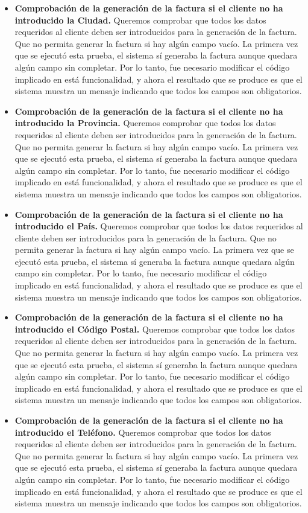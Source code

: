 \begin{itemize}
\begin{itemize}
	\item \textbf{Comprobación de la generación de la factura si el cliente no ha introducido la Ciudad.} Queremos comprobar que todos los datos requeridos al cliente deben ser introducidos para la generación de la factura. Que no permita generar la factura si hay algún campo vacío. La primera vez que se ejecutó esta prueba, el sistema sí generaba la factura aunque quedara algún campo sin completar. Por lo tanto, fue necesario modificar el código implicado en está funcionalidad, y ahora el resultado que se produce es que el sistema muestra un mensaje indicando que todos los campos son obligatorios.
	\item \textbf{Comprobación de la generación de la factura si el cliente no ha introducido la Provincia.} Queremos comprobar que todos los datos requeridos al cliente deben ser introducidos para la generación de la factura. Que no permita generar la factura si hay algún campo vacío. La primera vez que se ejecutó esta prueba, el sistema sí generaba la factura aunque quedara algún campo sin completar. Por lo tanto, fue necesario modificar el código implicado en está funcionalidad, y ahora el resultado que se produce es que el sistema muestra un mensaje indicando que todos los campos son obligatorios.
	\item \textbf{Comprobación de la generación de la factura si el cliente no ha introducido el País.} Queremos comprobar que todos los datos requeridos al cliente deben ser introducidos para la generación de la factura. Que no permita generar la factura si hay algún campo vacío. La primera vez que se ejecutó esta prueba, el sistema sí generaba la factura aunque quedara algún campo sin completar. Por lo tanto, fue necesario modificar el código implicado en está funcionalidad, y ahora el resultado que se produce es que el sistema muestra un mensaje indicando que todos los campos son obligatorios.
	\item \textbf{Comprobación de la generación de la factura si el cliente no ha introducido el Código Postal.} Queremos comprobar que todos los datos requeridos al cliente deben ser introducidos para la generación de la factura. Que no permita generar la factura si hay algún campo vacío. La primera vez que se ejecutó esta prueba, el sistema sí generaba la factura aunque quedara algún campo sin completar. Por lo tanto, fue necesario modificar el código implicado en está funcionalidad, y ahora el resultado que se produce es que el sistema muestra un mensaje indicando que todos los campos son obligatorios.
	\item \textbf{Comprobación de la generación de la factura si el cliente no ha introducido el Teléfono.} Queremos comprobar que todos los datos requeridos al cliente deben ser introducidos para la generación de la factura. Que no permita generar la factura si hay algún campo vacío. La primera vez que se ejecutó esta prueba, el sistema sí generaba la factura aunque quedara algún campo sin completar. Por lo tanto, fue necesario modificar el código implicado en está funcionalidad, y ahora el resultado que se produce es que el sistema muestra un mensaje indicando que todos los campos son obligatorios.

\end{itemize}
\end{itemize}
